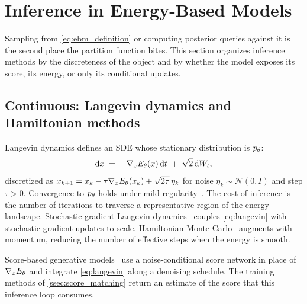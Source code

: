 
\section{Inference in Energy-Based Models}
\label{sec:ebm_inference}

Sampling from \cref{eq:ebm_definition} or computing posterior queries against it is the second place the partition function bites.
This section organizes inference methods by the discreteness of the object and by whether the model exposes its score, its energy, or only its conditional updates.

\subsection{Continuous: Langevin dynamics and Hamiltonian methods}
\label{ssec:langevin}

Langevin dynamics defines an SDE whose stationary distribution is $p_\theta$:
\begin{equation}
  \mathrm{d} x \;=\; -\nabla_x E_\theta(x)\, \mathrm{d}t \;+\; \sqrt{2}\, \mathrm{d}W_t,
  \label{eq:langevin}
\end{equation}
discretized as $x_{k+1} = x_k - \tau \nabla_x E_\theta(x_k) + \sqrt{2\tau}\, \eta_k$ for noise $\eta_k \sim \mathcal{N}(0, I)$ and step $\tau > 0$.
Convergence to $p_\theta$ holds under mild regularity~\citep{roberts1996exponential}.
The cost of inference is the number of iterations to traverse a representative region of the energy landscape.
Stochastic gradient Langevin dynamics~\citep{welling2011bayesian} couples \cref{eq:langevin} with stochastic gradient updates to scale.
Hamiltonian Monte Carlo~\citep{neal2011mcmc,betancourt2017conceptual} augments with momentum, reducing the number of effective steps when the energy is smooth.

Score-based generative models~\citep{song2019generative,song2021scorebased} use a noise-conditional score network in place of $\nabla_x E_\theta$ and integrate \cref{eq:langevin} along a denoising schedule.
The training methods of \cref{ssec:score_matching} return an estimate of the score that this inference loop consumes.

